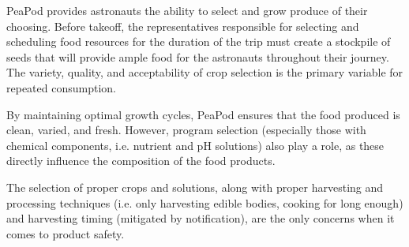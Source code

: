 PeaPod provides astronauts the ability to select and grow produce of their choosing. Before takeoff, the representatives responsible for selecting and scheduling food resources for the duration of the trip must create a stockpile of seeds that will provide ample food for the astronauts throughout their journey. The variety, quality, and acceptability of crop selection is the primary variable for repeated consumption.

By maintaining optimal growth cycles, PeaPod ensures that the food produced is clean, varied, and fresh. However, program selection (especially those with chemical components, i.e. nutrient and pH solutions) also play a role, as these directly influence the composition of the food products.

The selection of proper crops and solutions, along with proper harvesting and processing techniques (i.e. only harvesting edible bodies, cooking for long enough) and harvesting timing (mitigated by notification), are the only concerns when it comes to product safety.